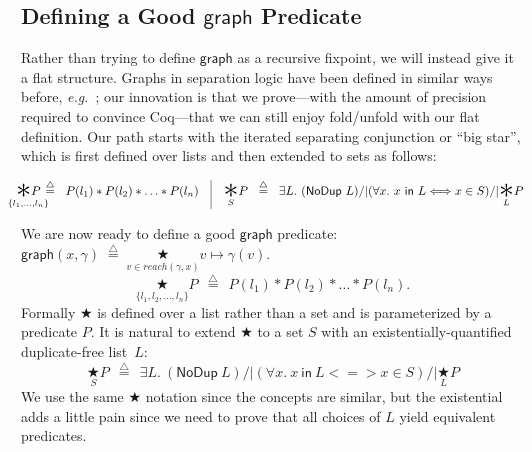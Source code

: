 \documentclass[acmsmall,screen]{acmart}
\newcommand\hide[1]{}
\newcommand{\defeq}{\mathbin{\stackrel{\triangle}{=}}}
\newcommand{\p}[1]{\ensuremath{\mathsf{#1}}} \newcommand{\m}[1]{\ensuremath{\mathit{#1}}} \newcommand{\ma}[1]{\ensuremath{\mathcal{#1}}} \let\ramify\lightning
\begin{document}
\hide{
\section{Difficulty using $\graphkt$}
\label{apx:problemrecgraph}


See Figure \ref{fig:badcycle} for an attempt to prove the entailment $100 |-> 42,100,0 ~ |- ~ \graphkt(100,\hat{\gamma})$.  Part of the problem is that the recursive structure interacts very badly with $**$: if the recursion involved~$*$~then it \textbf{would} be provable, by induction on the finite memory (each ``recursive call'' would be on a strictly smaller subheap).  This is why Knaster-Tarski works so well with list, tree, and DAG predicates in separation logic.
}












\subsection{Defining a Good \p{graph} Predicate}\label{sec:goodgraph}

Rather than trying to define \p{graph} as a recursive fixpoint,
we will instead give it a flat structure.  Graphs in separation
logic have been defined in similar ways before, \emph{e.g.}~\citet{ilya-graphs};
our innovation is that we prove---with the amount of precision
required to convince Coq---that we can still enjoy fold/unfold
with our flat definition.  Our path starts with the iterated
separating conjunction or ``big star'', which is first defined over
lists and then extended to sets as follows:

\vspace{-1em}
\[
\begin{array}{@{}l@{}}
\!\!\!\!\!\!\!\underset{\{l_1,\dots,l_n\}}{\bigstar P}\!\!\!\!\!\!\! ~~ \defeq ~~ P(l_1) *
  P(l_2) * \dots * P(l_n) \quad \vline \quad
\underset{S}{\bigstar} P ~~ \defeq ~~ \exists L.~ (\p{NoDup}\ L) /| (\forall x.~ x\ \p{in}\ L <=> x \in S) /| \underset{L}{\bigstar}P
\end{array}
\]

We are now ready to define a good \p{graph} predicate:
  \quad $\p{graph}(x, \gamma) \; \defeq \; \!\!\!\!\!\!\!\!\!\!\underset{\m{v} \in \mathit{reach}(\gamma, x)}{\bigstar}\!\!\!\!\!\!\m{v}\mapsto\gamma(\m{v})$.
\iffalse
\begin{equation*}
  \underset{\{l_1, l_2,\dots,l_n\}}{\bigstar}P ~~ \defeq ~~ P(l_1) *
  P(l_2) * \dots * P(l_n).
\end{equation*}
Formally $\bigstar$ is defined over a list rather than a set and is parameterized by a predicate $P$.  It is natural to extend $\bigstar$ to a set $S$ with an existentially-quantified duplicate-free list~$L$:
\[
\underset{S}{\bigstar} P ~~ \defeq ~~ \exists L.~ (\p{NoDup}\ L) /| (\forall x.~ x\ \p{in}\ L <=> x \in S) /| \underset{L}{\bigstar}P
\]
We use the same $\bigstar$ notation since the concepts are similar, but the existential adds a little pain since we need to prove that all choices of $L$ yield equivalent predicates.
\end{document}
